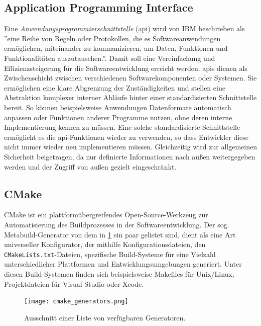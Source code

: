 \subsection{Application Programming Interface}
Eine \emph{Anwendungsprogrammierschnittstelle} (\gls{api}) wird von IBM beschrieben als ''eine Reihe von Regeln oder Protokollen, die es Softwareanwendungen ermöglichen, miteinander zu kommunizieren, um Daten, Funktionen und Funktionalitäten auszutauschen.''\cite{ibmAPI}.
Damit soll eine Vereinfachung und Effizienzsteigerung für die Softwareentwicklung erreicht werden.
\glspl{api} dienen als Zwischenschicht zwischen verschiedenen Softwarekomponenten oder Systemen.
Sie ermöglichen eine klare Abgrenzung der Zuständigkeiten und stellen eine Abstraktion komplexer interner Abläufe hinter einer standardisierten Schnittstelle bereit.
So können beispielsweise Anwendungen Datenformate automatisch anpassen oder Funktionen anderer Programme nutzen, ohne deren interne Implementierung kennen zu müssen.
Eine solche standardisierte Schnittstelle ermöglicht es die \gls{api}-Funktionen wieder zu verwenden, so dass Entwickler diese nicht immer wieder neu implementieren müssen.
Gleichzeitig wird zur allgemeinen Sicherheit beigetragen, da nur definierte Informationen nach außen weitergegeben werden und der Zugriff von außen gezielt eingeschränkt.


\subsection{CMake}
CMake ist ein plattformübergreifendes Open-Source-Werkzeug zur Automatisierung des Buildprozesses in der Softwareentwicklung.
Der sog. Metabuild-Generator von dem in \cref{fig:cmake_generators} ein paar gelistet sind, dient als eine Art universeller Konfigurator, der mithilfe Konfigurationsdateien, den \texttt{CMakeLists.txt}-Dateien, spezifische Build-Systeme für eine Vielzahl unterschiedlicher Plattformen und Entwicklungsumgebungen generiert.
Unter diesen Build-Systemen finden sich beispielsweise Makefiles für Unix/Linux, Projektdateien für Visual Studio oder Xcode.

\begin{figure}[H]
	\texttt{[image: cmake\_generators.png]}
	\caption{Ausschnitt einer Liste von verfügbaren Generatoren.}
	\label{fig:cmake_generators}
\end{figure}

